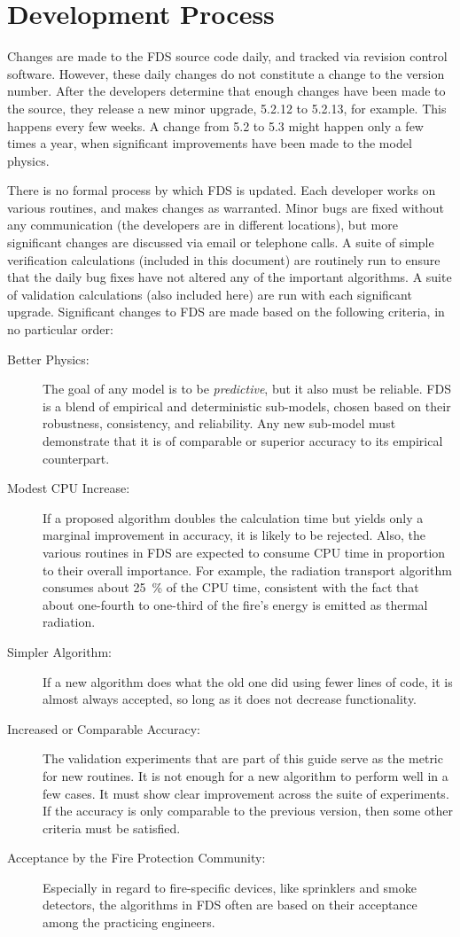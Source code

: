 \documentclass[11pt]{book}
\begin{document}
\clearpage
\section{Development Process}

Changes are made to the FDS source code daily, and tracked via revision control software. However, these daily changes do not constitute a change to
the version number. After the developers determine that enough changes have been made to the source, they release a new minor upgrade, 5.2.12 to
5.2.13, for example. This happens every few weeks. A change from 5.2 to 5.3 might happen only a few times a year, when significant improvements have
been made to the model physics.

There is no formal process by which FDS is updated. Each developer works on various routines, and makes changes as warranted. Minor bugs are fixed
without any communication (the developers are in different locations), but more significant changes are discussed via email or telephone calls. A
suite of simple verification calculations (included in this document) are routinely run to ensure that the daily bug fixes have not altered any of
the important algorithms. A suite of validation calculations (also included here) are run with each significant upgrade. Significant changes to FDS
are made based on the following criteria, in no particular order:
\begin{description}
\item[Better Physics:] The goal of any model is to be {\em predictive}, but it also must be reliable. FDS is a blend of empirical and
deterministic sub-models, chosen based on their robustness, consistency, and reliability. Any new sub-model must demonstrate that it is of comparable
or superior accuracy to its empirical counterpart.
\item[Modest CPU Increase:] If a proposed algorithm doubles the calculation time but yields only a marginal improvement in accuracy, it is
likely to be rejected. Also, the various routines in FDS are expected to consume CPU time in proportion to their overall importance. For example, the
radiation transport algorithm consumes about 25~\% of the CPU time, consistent with the fact that about one-fourth to one-third of the fire's energy
is emitted as thermal radiation.
\item[Simpler Algorithm:] If a new algorithm does what the old one did using fewer lines of code, it is almost always accepted, so long as
it does not decrease functionality.
\item[Increased or Comparable Accuracy:] The validation experiments that are part of this guide serve as the metric for new routines. It is
not enough for a new algorithm to perform well in a few cases. It must show clear improvement across the suite of experiments. If the accuracy is
only comparable to the previous version, then some other criteria must be satisfied.
\item[Acceptance by the Fire Protection Community:] Especially in regard to fire-specific devices, like sprinklers and smoke detectors, the
algorithms in FDS often are based on their acceptance among the practicing engineers.
\end{description}
\end{document}
